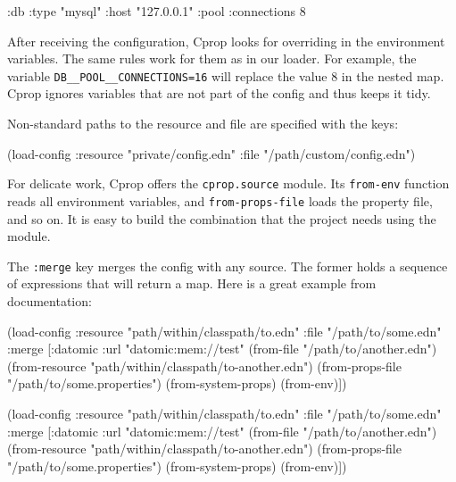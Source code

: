 \begin{clojure}
{:db {:type "mysql"
      :host "127.0.0.1"
      :pool {:connections 8}}}
\end{clojure}

After receiving the configuration, Cprop looks for overriding in the environment variables. The same rules work for them as in our loader.
For example, the variable \texttt{DB\_\_POOL\_\_CONNEC\-TIONS=16} will replace the value 8 in the nested map. Cprop ignores variables that are not part of the config and thus keeps it tidy.

Non-standard paths to the resource and file are specified with the keys:

\begin{clojure}
(load-config
 :resource "private/config.edn"
 :file "/path/custom/config.edn")
\end{clojure}


For delicate work, Cprop offers the \verb|cprop.source| module. Its \verb|from-env| function reads all environment variables, and \verb|from-props-file| loads the property file, and so on. It is easy to build the combination that the project needs using the module.

The \verb|:merge| key merges the config with any source. The former holds a sequence of expressions that will return a map. Here is a great example from documentation:

\ifnarrow

\begin{clojure}
(load-config
 :resource "path/within/classpath/to.edn"
 :file "/path/to/some.edn"
 :merge
 [{:datomic {:url "datomic:mem://test"}}
  (from-file "/path/to/another.edn")
  (from-resource
  "path/within/classpath/to-another.edn")
  (from-props-file
   "/path/to/some.properties")
  (from-system-props)
  (from-env)])
\end{clojure}

\else

\begin{clojure}
(load-config
 :resource "path/within/classpath/to.edn"
 :file "/path/to/some.edn"
 :merge [{:datomic {:url "datomic:mem://test"}}
         (from-file "/path/to/another.edn")
         (from-resource "path/within/classpath/to-another.edn")
         (from-props-file "/path/to/some.properties")
         (from-system-props)
         (from-env)])
\end{clojure}

\fi

